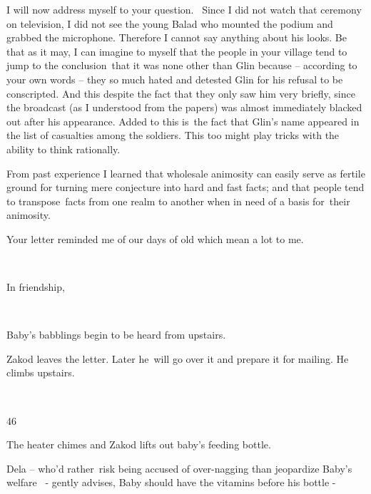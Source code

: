 \documentclass[letterpaper]{article}
\begin{document}
I will now address myself to your question. ~Since I did not watch that ceremony on television, I did not see the young
Balad who mounted the podium and grabbed the microphone. Therefore I cannot say anything about his looks. Be that as it
may, I can imagine to myself that the people in your village tend to jump to the conclusion~that it was none other than
Glin because -- according to your own words -- they {\textquotedbl}so much hated and detested Glin for his refusal to
be conscripted.{\textquotedbl} And this despite the fact that they only saw him very briefly, since the broadcast (as I
understood from the papers) was almost immediately blacked out after his appearance. Added to this is~the fact that
Glin's name appeared in the list of casualties among the soldiers. This too might play tricks with the ability to think
rationally.

From past experience I learned that wholesale animosity can easily serve as fertile ground for turning mere conjecture
into hard and fast facts; and that people tend to transpose~facts from one realm to another when in need of a basis
for~their animosity.

Your letter reminded me of our days of old which mean a lot to me. 

~

In friendship,

~

Baby's babblings begin to be heard from upstairs.~~~~~~ 

Zakod leaves the letter. Later he~will go over it and prepare it for mailing. He climbs upstairs.

~

46 

The heater chimes and Zakod lifts out baby's feeding bottle. 

Dela -- who'd rather~risk being accused of over-nagging than jeopardize Baby's welfare ~- gently advises,
{\textquotedbl}Baby should have the vitamins before his bottle -{\textquotedbl} 
\end{document}
